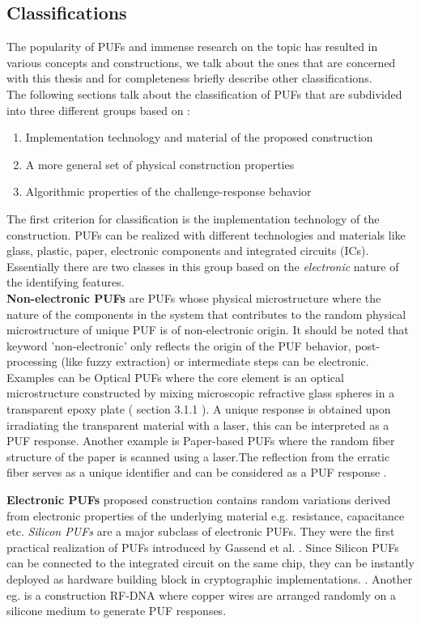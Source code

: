 \subsection{Classifications}
The popularity of PUFs and immense research on the topic has resulted in various concepts and constructions, we talk about the ones that are concerned with this thesis and for completeness briefly describe other classifications.\\
The following sections talk about the classification of PUFs that are subdivided into three different groups based on \cite{17}:
\begin{enumerate}
	\item Implementation technology and material of the proposed construction
	\item A more general set of physical construction properties
	\item Algorithmic properties of the challenge-response behavior
\end{enumerate}

The first criterion for classification is the implementation technology of the construction. PUFs can be realized with different technologies and materials like glass, plastic, paper, electronic components and integrated circuits (ICs). Essentially there are two classes in this group based on the \emph{electronic} nature of the identifying features.\\

\textbf{Non-electronic PUFs} are PUFs whose physical microstructure where the nature of the components in the system that contributes to the random physical microstructure of unique PUF is of non-electronic origin. It should be noted that keyword 'non-electronic' only reflects the origin of the PUF behavior, post-processing (like fuzzy extraction) or intermediate steps can be electronic. Examples can be Optical PUFs where the core element is an optical microstructure constructed by mixing
microscopic refractive glass spheres in a transparent epoxy plate ( section 3.1.1 \cite{thbook}). A unique response is obtained upon irradiating the transparent material with a laser, this can be interpreted as a PUF response. Another example is Paper-based PUFs where the random fiber structure of the paper is scanned using a laser.The reflection from the erratic fiber serves as a unique identifier and can be considered as a PUF response \cite{thbook}.

\textbf{Electronic PUFs} proposed construction contains random variations derived from electronic properties of the underlying material e.g. resistance, capacitance etc. \emph{Silicon PUFs} are a major subclass of electronic PUFs. They were the first practical realization of PUFs introduced by Gassend et al. \cite{21}. Since Silicon PUFs can be connected to the integrated circuit on the same chip, they can be instantly deployed as hardware building block in cryptographic implementations. \cite{17}.
Another eg. is a construction RF-DNA where copper wires are arranged randomly on a silicone medium to generate PUF responses.\\

